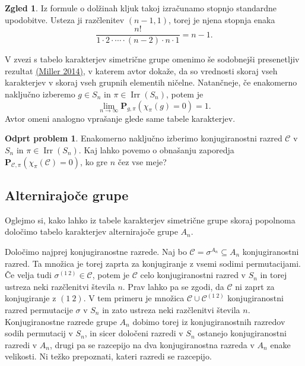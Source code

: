 \documentclass[11pt]{book}
\def\conclass{\mathcal{C}}
\def\PP{\mathbf{P}}
\DeclareMathOperator\Irr{Irr}
\theoremstyle{definition}
\theoremstyle{zgled}
\newtheorem*{zgled}{Zgled}
\theoremstyle{odprtproblem}
\newtheorem*{odprtproblem}{Odprt problem}
\theoremstyle{domacanaloga}
\theoremstyle{izrek}
\begin{document}
\begin{zgled}
Iz formule o dolžinah kljuk takoj izračunamo stopnjo standardne upodobitve. Usteza ji razčlenitev $(n-1,1)$, torej je njena stopnja enaka
\[
    \frac{n!}{1 \cdot 2 \cdot \cdots \cdot (n-2) \cdot n \cdot 1} = n-1.
\]
\end{zgled}

V zvezi s tabelo karakterjev simetrične grupe omenimo še sodobnejši presenetljiv rezultat \href{https://link.springer.com/article/10.1007/s00209-014-1290-x}{(Miller 2014)}, v katerem avtor dokaže, da so vrednosti skoraj vseh karakterjev v skoraj vseh grupnih elementih ničelne. Natančneje, če enakomerno naključno izberemo $g \in S_n$ in $\pi \in \Irr(S_n)$, potem je
\[
    \lim_{n \to \infty} \PP_{g, \pi}\left(\chi_{\pi}(g) = 0\right) = 1.
\]
Avtor omeni analogno vprašanje glede same tabele karakterjev.

\begin{odprtproblem}
Enakomerno naključno izberimo konjugiranostni razred $\conclass$ v $S_n$ in $\pi \in \Irr(S_n)$. Kaj lahko povemo o obnašanju zaporedja $\PP_{\conclass, \pi}\left( \chi_{\pi}(\conclass) = 0 \right)$, ko gre $n$ čez vse meje?
\end{odprtproblem}

\subsection{Alternirajoče grupe}

Oglejmo si, kako lahko iz tabele karakterjev simetrične grupe skoraj popolnoma določimo tabelo karakterjev alternirajoče grupe $A_n$.

Določimo najprej konjugiranostne razrede. Naj bo $\conclass = \sigma^{A_n} \subseteq A_n$ konjugiranostni razred. Ta množica je torej zaprta za konjugiranje z vsemi sodimi permutacijami. Če velja tudi $\sigma^{(1 \ 2)} \in \conclass$, potem je $\conclass$ celo konjugiranostni razred v $S_n$ in torej ustreza neki razčlenitvi števila $n$. Prav lahko pa se zgodi, da $\conclass$ ni zaprt za konjugiranje z $(1 \ 2)$. V tem primeru je množica $\conclass \cup \conclass^{(1 \ 2)}$ konjugiranostni razred permutacije $\sigma$ v $S_n$ in zato ustreza neki razčlenitvi števila $n$. Konjugiranostne razrede grupe $A_n$ dobimo torej iz konjugiranostnih razredov sodih permutacij v $S_n$, in sicer določeni razredi v $S_n$ ostanejo konjugiranostni razredi v $A_n$, drugi pa se razcepijo na dva konjugiranostna razreda v $A_n$ enake velikosti. Ni težko prepoznati, kateri razredi se razcepijo.
\end{document}
